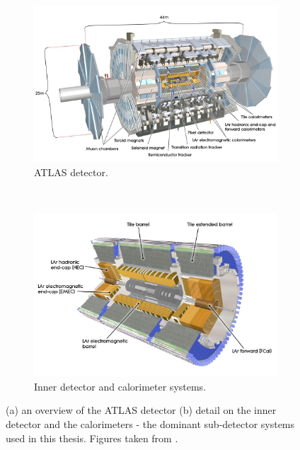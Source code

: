 \begin{figure}[p]
  \centering
  \begin{subfigure}[b]{0.9\textwidth}
    \includegraphics[width=\textwidth]{Chapter2/ATLAS.png}
    \caption{ATLAS detector.}
    \label{fig:ATLASfull}
  \end{subfigure}
  ~
  \begin{subfigure}[b]{0.9\textwidth}
    \includegraphics[width=\textwidth]{Chapter2/ATLASinner.jpeg}
    \caption{Inner detector and calorimeter systems.}
    \label{fig:ATLASinner}
  \end{subfigure}
  \caption[(a) an overview of the ATLAS detector 
           (b) detail on the inner detector and the calorimeters - the dominant
           sub-detector systems used in this thesis.]
           {(a) an overview of the ATLAS detector 
           (b) detail on the inner detector and the calorimeters - the dominant
           sub-detector systems used in this thesis. Figures taken from
           \cite{CERNbook}.}
  \label{fig:ATLAS}
\end{figure}

